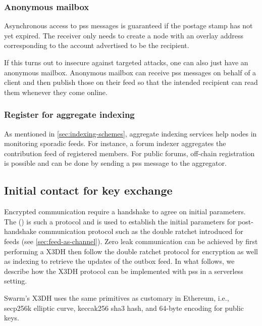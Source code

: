 \subsubsection{Anonymous mailbox}

Asynchronous access to pss messages is guaranteed if the postage stamp has not yet expired. The receiver only needs to  create a node with an overlay address corresponding to the account advertised to be the recipient.    

If this turns out to insecure against targeted attacks, one can also just have an anonymous mailbox. Anonymous mailbox can receive pss messages on behalf of a client and then publish those on their feed so  that the intended recipient can read them whenever they come online.

\subsubsection{Register for aggregate indexing}

As mentioned in \ref{sec:indexing-schemes},  aggregate indexing services help nodes in monitoring sporadic feeds. For instance, a forum indexer aggregates the contribution feed of registered members. For public forums, off-chain registration  is possible and can be done by sending a pss message to the aggregator. 


\subsection{Initial contact for key exchange\statusgreen}\label{sec:pss-key-exchange}


Encrypted communication require a handshake to agree on initial parameters. The  () is such a  protocol \cite{marlinspike2016x3dh} and is used to establish the initial parameters for post-handshake communication protocol such as the double ratchet introduced for feeds (see \ref{sec:feed-as-channel}). 
Zero leak communication can be achieved by first performing a X3DH then follow the double ratchet protocol for encryption as well as indexing to retrieve the updates of the outbox feed.
In what follows, we describe how the X3DH protocol can be implemented with pss in a serverless setting. 

Swarm's X3DH uses the same primitives as customary in Ethereum, i.e., secp256k elliptic curve, keccak256 sha3 hash, and 64-byte encoding for public keys.

